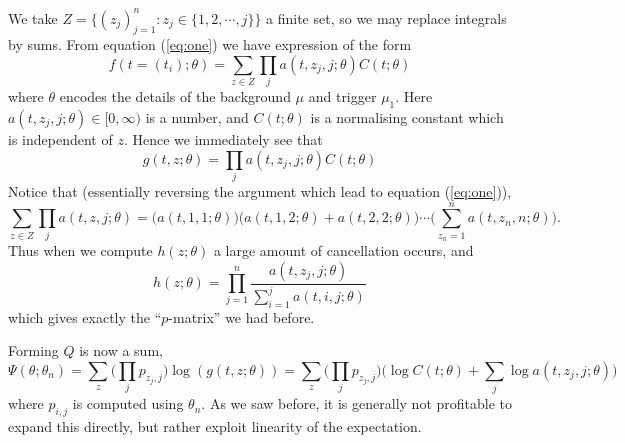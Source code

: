 \documentclass[twoside,a4paper]{article}
\theoremstyle{plain}
\theoremstyle{definition}
\begin{document}
We take $Z = \{ (z_j)_{j=1}^n : z_j \in \{1,2,\cdots,j\} \}$ a finite set, so we may replace integrals
by sums.  From equation (\ref{eq:one}) we have expression of the form
\[ f(t=(t_i); \theta) = \sum_{z\in Z} \prod_j a(t,z_j,j;\theta) C(t;\theta) \]
where $\theta$ encodes the details of the background $\mu$ and trigger $\mu_1$.  Here $a(t,z_j,j;\theta)
\in [0,\infty)$ is a number, and $C(t;\theta)$ is a normalising constant which is independent of $z$.
Hence we immediately see that
\[ g(t,z; \theta) = \prod_j a(t,z_j,j;\theta) C(t;\theta) \]
Notice that (essentially reversing the argument which lead to equation (\ref{eq:one})),
\[ \sum_{z\in Z} \prod_j a(t,z,j;\theta) = \big( a(t,1,1;\theta) \big)
\big( a(t,1,2;\theta) + a(t,2,2;\theta) \big) \cdots \Big( \sum_{z_n=1}^n a(t,z_n,n;\theta) \Big). \]
Thus when we compute $h(z;\theta)$ a large amount of cancellation occurs, and
\[ h(z;\theta) = \prod_{j=1}^n \frac{a(t,z_j,j;\theta)}{\sum_{i=1}^j a(t,i,j;\theta)} \]
which gives exactly the ``$p$-matrix'' we had before.

Forming $Q$ is now a sum,
\[ \Psi(\theta;\theta_n) = \sum_z \Big(\prod_j p_{z_j,j}\Big) \log(g(t,z;\theta)) 
= \sum_z \Big(\prod_j p_{z_j,j}\Big) \Big( \log C(t;\theta) + \sum_j \log a(t,z_j,j;\theta) \Big) \]
where $p_{i,j}$ is computed using $\theta_n$.  As we saw before, it is generally not profitable
to expand this directly, but rather exploit linearity of the expectation.
\end{document}
